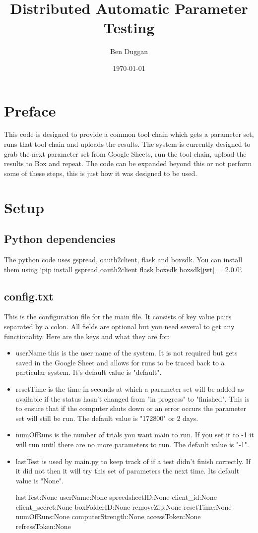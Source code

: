 \documentclass[12pt]{article}
\begin{document}
\title{\vspace{-3cm}Distributed Automatic Parameter Testing}
\author{Ben Duggan}
\date{\today}
\maketitle

\section{Preface}
This code is designed to provide a common tool chain which gets a parameter set, runs that tool chain and uploads the results.  The system is currently designed to grab the next parameter set from Google Sheets, run the tool chain, upload the results to Box and repeat.  The code can be expanded beyond this or not perform some of these steps, this is just how it was designed to be used.

\section{Setup}
\subsection{Python dependencies}
The python code uses gspread, oauth2client, flask and boxsdk.  You can install them using `pip install gspread oauth2client flask boxsdk boxsdk[jwt]==2.0.0`.


\subsection{config.txt}
This is the configuration file for the main file.  It consists of key value pairs separated by a colon.  All fields are optional but you need several to get any functionality.  Here are the keys and what they are for:
\begin{itemize}
	\item userName this is the user name of the system.  It is not required but gets saved in the Google Sheet and allows for runs to be traced back to a particular system.  It's default value is "default".
	\item resetTime is the time in seconds at which a parameter set will be added as available if the status hasn't changed from "in progress" to "finished".  This is to ensure that if the computer shuts down or an error occurs the parameter set will still be run.  The default value is "172800" or 2 days.
	\item numOfRuns is the number of trials you want main to run.  If you set it to -1 it will run until there are no more parameters to run.  The default value is "-1".
	\item lastTest is used by main.py to keep track of if a test didn't finish correctly.  If it did not then it will try this set of parameters the next time.  Its default value is "None".
	
	lastTest:None
	userName:None
	spreedsheetID:None
	client\_id:None
	client\_secret:None
	boxFolderID:None
	removeZip:None
	resetTime:None
	numOfRuns:None
	computerStrength:None
	accessToken:None
	refressToken:None
\end{itemize}
\end{document}
